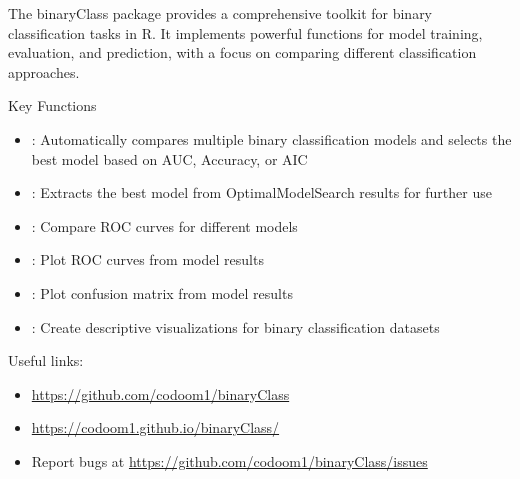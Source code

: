 \documentclass[a4paper]{book}
\begin{document}
%
\begin{Description}
The binaryClass package provides a comprehensive toolkit for binary 
classification tasks in R. It implements powerful functions for model 
training, evaluation, and prediction, with a focus on comparing different 
classification approaches.
\end{Description}
%
\begin{Section}{Key Functions}

\begin{itemize}

\item{} : Automatically compares multiple binary 
classification models and selects the best model based on AUC, 
Accuracy, or AIC
\item{} : Extracts the best model from 
OptimalModelSearch results for further use
\item{} : Compare ROC curves for different models
\item{} : Plot ROC curves from model results
\item{} : Plot confusion matrix from model results
\item{} : Create descriptive visualizations for binary
classification datasets

\end{itemize}

\end{Section}
%
\begin{SeeAlso}
Useful links:
\begin{itemize}

\item{} \url{https://github.com/codoom1/binaryClass}
\item{} \url{https://codoom1.github.io/binaryClass/}
\item{} Report bugs at \url{https://github.com/codoom1/binaryClass/issues}

\end{itemize}


\end{SeeAlso}
\end{document}
